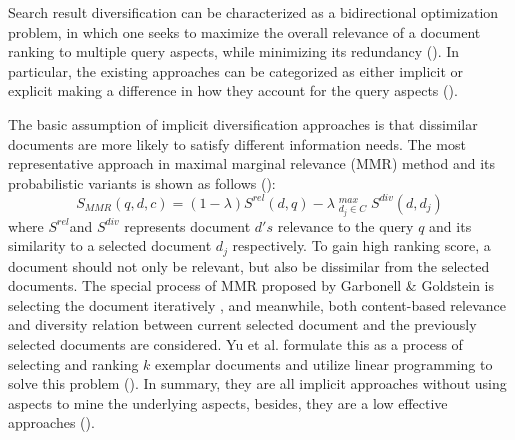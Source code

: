 \documentclass[review]{elsarticle}
\newcommand\revised[1]{{\color{black} #1}}
\begin{document}
\revised{
	
	Search result diversification can be characterized as a bidirectional optimization problem, in which one seeks to maximize the overall relevance of a document ranking to multiple query aspects, while minimizing its redundancy (\cite{Santos:2010:EQR:1772690.1772780}). In particular, the existing approaches can be categorized as either implicit or explicit making a difference in how they account for the query aspects (\cite{10.1007/978-3-642-12275-0_11}).
	}

\revised{
 The basic assumption of implicit diversification approaches is that dissimilar documents are more likely to satisfy different information needs. The most representative approach in maximal marginal relevance (MMR) method and its probabilistic variants is shown as follows (\cite{zhai2003beyond}):
\begin{equation}
S_{MMR}(q,d,c) = (1-\lambda)S^{rel}(d,q) - \lambda \mathop{}_{d_j \in C}^{max}   S^{div}(d,d_{j})
\end{equation}
where $ S^{rel}  $and $ S^{div}  $ represents  document $d's$ relevance to the query $q$ and its similarity to a selected document $d_{j}$ respectively. To gain high ranking score, a document should not only be relevant, but also be dissimilar from the selected documents.
The special process of MMR proposed by Garbonell \& Goldstein is selecting the document iteratively \cite{carbonell1998use}, and meanwhile, both content-based relevance and diversity relation between current selected document and the previously selected documents are considered. Yu et al. formulate this as a process of selecting and ranking $k$ exemplar documents and utilize linear programming to solve this problem (\cite{Yu:2017:CIL:3018661.3018710}).
In summary, they are all implicit approaches without using aspects to mine the underlying aspects, besides, they are a low effective approaches (\cite{santos2010exploiting,drosou2010search}).


}
\end{document}
